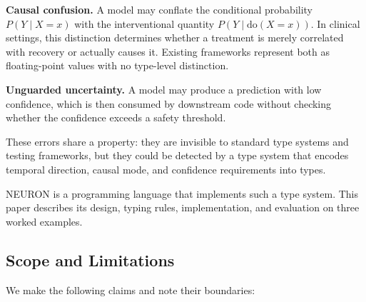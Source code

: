 \documentclass[11pt,a4paper]{article}
\begin{document}
\textbf{Causal confusion.} A model may conflate the conditional probability $P(Y \mid X = x)$ with the interventional quantity $P(Y \mid \text{do}(X = x))$. In clinical settings, this distinction determines whether a treatment is merely correlated with recovery or actually causes it. Existing frameworks represent both as floating-point values with no type-level distinction.

\textbf{Unguarded uncertainty.} A model may produce a prediction with low confidence, which is then consumed by downstream code without checking whether the confidence exceeds a safety threshold.

These errors share a property: they are invisible to standard type systems and testing frameworks, but they could be detected by a type system that encodes temporal direction, causal mode, and confidence requirements into types.

NEURON is a programming language that implements such a type system. This paper describes its design, typing rules, implementation, and evaluation on three worked examples.

\subsection{Scope and Limitations}

We make the following claims and note their boundaries:
\end{document}

